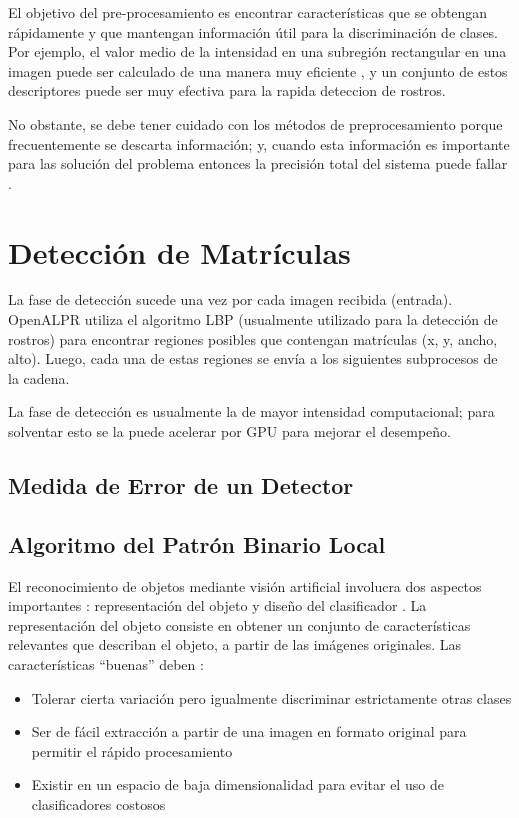 El objetivo del pre-procesamiento es encontrar características que se obtengan rápidamente y que mantengan información útil para la discriminación de clases. Por ejemplo, el valor medio de la intensidad en una subregión rectangular en una imagen puede ser calculado de una manera muy eficiente \parencite{Viola2004-bx}, y un conjunto de estos descriptores puede ser muy efectiva para la rapida deteccion de rostros.

No obstante, se debe tener cuidado con los métodos de preprocesamiento porque frecuentemente se descarta información; y, cuando esta información es importante para las solución del problema entonces la precisión total del sistema puede fallar \parencite{Bishop2007-am}.

\section{Detección de Matrículas}
La fase de detección sucede una vez por cada imagen recibida (entrada). OpenALPR utiliza el algoritmo LBP (usualmente utilizado para la detección de rostros) para encontrar regiones posibles que contengan matrículas (x, y, ancho, alto). Luego, cada una de estas regiones se envía a los siguientes subprocesos de la cadena.

La fase de detección es usualmente la de mayor intensidad computacional; para solventar esto se la puede acelerar por GPU para mejorar el desempeño. 

\subsection{Medida de Error de un Detector}

\subsection{Algoritmo del Patrón Binario Local}
El reconocimiento de objetos mediante visión artificial involucra dos aspectos importantes \parencite{Huang2011-ud}: representación del objeto \parencite{Ahonen2006-gg} y diseño del clasificador \parencite{Cover1967-vb,Wright2009-en,Cortes1995-qx}. La representación del objeto consiste en obtener un conjunto de características relevantes que describan el objeto, a partir de las imágenes originales. Las características “buenas” deben \parencite{Hadid2004-dk}:

\begin{itemize}
\item Tolerar cierta variación pero igualmente discriminar estrictamente otras clases
\item Ser de fácil extracción a partir de una imagen en formato original para permitir el rápido procesamiento
\item Existir en un espacio de baja dimensionalidad para evitar el uso de clasificadores costosos
\end{itemize}

